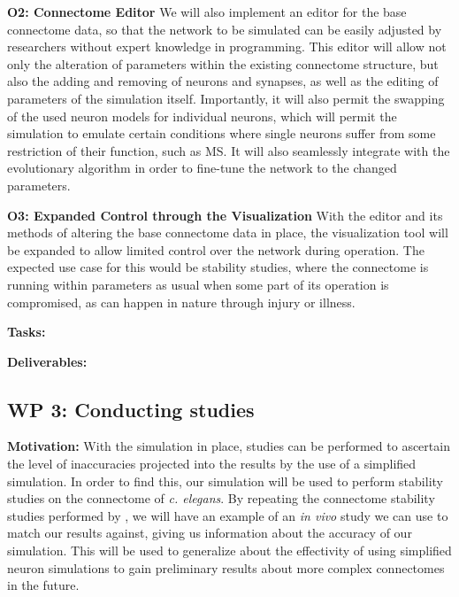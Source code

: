 \documentclass[a4paper,11pt]{article}
\begin{document}
\textbf{O2: Connectome Editor}
We will also implement an editor for the base connectome data, so that the network to be simulated can be easily adjusted by researchers without expert knowledge in programming. This editor will allow not only the alteration of parameters within the existing connectome structure, but also the adding and removing of neurons and synapses, as well as the editing of parameters of the simulation itself. Importantly, it will also permit the swapping of the used neuron models for individual neurons, which will permit the simulation to emulate certain conditions where single neurons suffer from some restriction of their function, such as MS. It will also seamlessly integrate with the evolutionary algorithm in order to fine-tune the network to the changed parameters.

\textbf{O3: Expanded Control through the Visualization}
With the editor and its methods of altering the base connectome data in place, the visualization tool will be expanded to allow limited control over the network during operation. The expected use case for this would be stability studies, where the connectome is running within parameters as usual when some part of its operation is compromised, as can happen in nature through injury or illness.

\textbf{Tasks:}

\textbf{Deliverables:} 



\subsection{WP 3: Conducting studies}

\textbf{Motivation:}
With the simulation in place, studies can be performed to ascertain the level of inaccuracies projected into the results by the use of a simplified simulation. In order to find this, our simulation will be used to perform stability studies on the connectome of \emph{c. elegans}. By repeating the connectome stability studies performed by , we will have an example of an \emph{in vivo} study we can use to match our results against, giving us information about the accuracy of our simulation. This will be used to generalize about the effectivity of using simplified neuron simulations to gain preliminary results about more complex connectomes in the future. 
\end{document}
